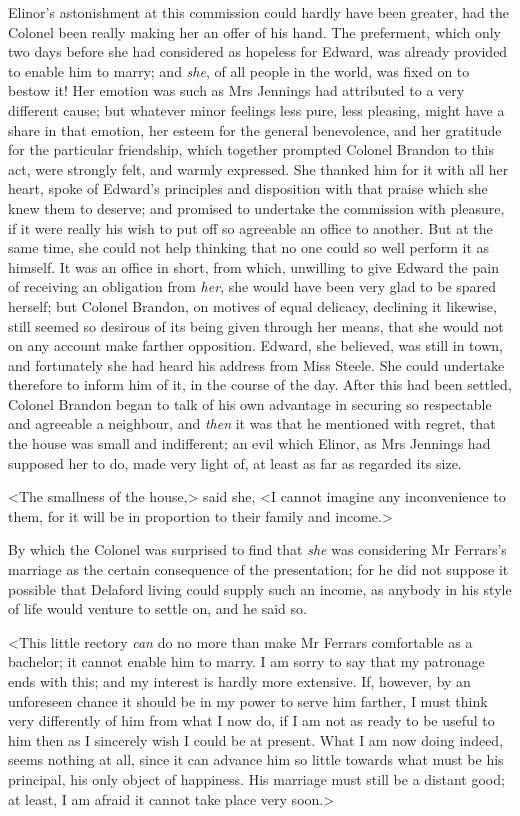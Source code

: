 Elinor's astonishment at this commission could hardly have been greater, had the Colonel been really making her an offer of his hand. The preferment, which only two days before she had considered as hopeless for Edward, was already provided to enable him to marry; and \textit{she}, of all people in the world, was fixed on to bestow it! Her emotion was such as Mrs Jennings had attributed to a very different cause; but whatever minor feelings less pure, less pleasing, might have a share in that emotion, her esteem for the general benevolence, and her gratitude for the particular friendship, which together prompted Colonel Brandon to this act, were strongly felt, and warmly expressed. She thanked him for it with all her heart, spoke of Edward's principles and disposition with that praise which she knew them to deserve; and promised to undertake the commission with pleasure, if it were really his wish to put off so agreeable an office to another. But at the same time, she could not help thinking that no one could so well perform it as himself. It was an office in short, from which, unwilling to give Edward the pain of receiving an obligation from \textit{her}, she would have been very glad to be spared herself; but Colonel Brandon, on motives of equal delicacy, declining it likewise, still seemed so desirous of its being given through her means, that she would not on any account make farther opposition. Edward, she believed, was still in town, and fortunately she had heard his address from Miss Steele. She could undertake therefore to inform him of it, in the course of the day. After this had been settled, Colonel Brandon began to talk of his own advantage in securing so respectable and agreeable a neighbour, and \textit{then} it was that he mentioned with regret, that the house was small and indifferent; an evil which Elinor, as Mrs Jennings had supposed her to do, made very light of, at least as far as regarded its size.

<The smallness of the house,> said she, <I cannot imagine any inconvenience to them, for it will be in proportion to their family and income.>

By which the Colonel was surprised to find that \textit{she} was considering Mr Ferrars's marriage as the certain consequence of the presentation; for he did not suppose it possible that Delaford living could supply such an income, as anybody in his style of life would venture to settle on, and he said so.

<This little rectory \textit{can} do no more than make Mr Ferrars comfortable as a bachelor; it cannot enable him to marry. I am sorry to say that my patronage ends with this; and my interest is hardly more extensive. If, however, by an unforeseen chance it should be in my power to serve him farther, I must think very differently of him from what I now do, if I am not as ready to be useful to him then as I sincerely wish I could be at present. What I am now doing indeed, seems nothing at all, since it can advance him so little towards what must be his principal, his only object of happiness. His marriage must still be a distant good; at least, I am afraid it cannot take place very soon.>

